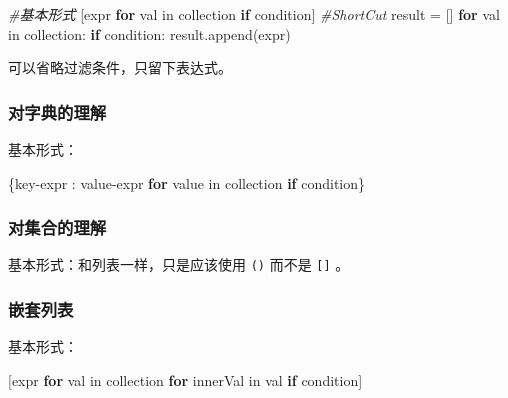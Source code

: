 \documentclass[]{ctexart}
\newenvironment{Shaded}{}{}
\newcommand{\CommentTok}[1]{\textcolor[rgb]{0.38,0.63,0.69}{\textit{{#1}}}}
\newcommand{\ControlFlowTok}[1]{\textcolor[rgb]{0.00,0.44,0.13}{\textbf{{#1}}}}
\newcommand{\OperatorTok}[1]{\textcolor[rgb]{0.40,0.40,0.40}{{#1}}}
\newcommand{\NormalTok}[1]{{#1}}
\begin{document}
\begin{Shaded}
\begin{Highlighting}[]
\CommentTok{#基本形式}
\NormalTok{[expr }\ControlFlowTok{for} \NormalTok{val }\OperatorTok{in} \NormalTok{collection }\ControlFlowTok{if} \NormalTok{condition]}
\CommentTok{#ShortCut}
\NormalTok{result }\OperatorTok{=} \NormalTok{[]}
\ControlFlowTok{for} \NormalTok{val }\OperatorTok{in} \NormalTok{collection:}
  \ControlFlowTok{if} \NormalTok{condition:}
    \NormalTok{result.append(expr)}
\end{Highlighting}
\end{Shaded}

可以省略过滤条件，只留下表达式。

\subsubsection{对字典的理解}\label{header-n371}

基本形式：

\begin{Shaded}
\begin{Highlighting}[]
\NormalTok{\{key}\OperatorTok{-}\NormalTok{expr : value}\OperatorTok{-}\NormalTok{expr }\ControlFlowTok{for} \NormalTok{value }\OperatorTok{in} \NormalTok{collection }\ControlFlowTok{if} \NormalTok{condition\}}
\end{Highlighting}
\end{Shaded}

\subsubsection{对集合的理解}\label{header-n375}

基本形式：和列表一样，只是应该使用 \texttt{()} 而不是 \texttt{{[}{]}} 。

\subsubsection{嵌套列表}\label{header-n378}

基本形式：

\begin{Shaded}
\begin{Highlighting}[]
\NormalTok{[expr }\ControlFlowTok{for} \NormalTok{val }\OperatorTok{in} \NormalTok{collection }\ControlFlowTok{for} \NormalTok{innerVal }\OperatorTok{in} \NormalTok{val }\ControlFlowTok{if} \NormalTok{condition]}
\end{Highlighting}
\end{Shaded}
\end{document}
